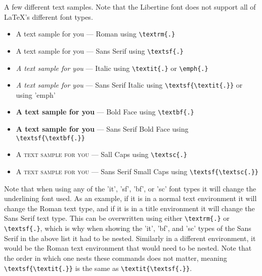 \documentclass[../thesis.tex]{subfiles}
\begin{document}
A few different text samples. Note that the Libertine font does not support all of \LaTeX's different font types.  
\begin{itemize}
    \item {\textrm{A text sample for you}} — Roman using \verb|\textrm{.}|
    \item {\textsf{A text sample for you}} — Sans Serif using \verb|\textsf{.}|
    \item {\textit{A text sample for you}} — Italic using \verb|\textit{.}| or \verb|\emph{.}|
    \item {\textsf{\textit{A text sample for you}}} — Sans Serif Italic using \verb|\textsf{\textit{.}}| or using 'emph'
    \item {\textbf{A text sample for you}} — Bold Face using \verb|\textbf{.}|
    \item {\textsf{\textbf{A text sample for you}}} — Sans Serif Bold Face using \verb|\textsf{\textbf{.}}|
    \item {\textsc{A text sample for you}} — Sall Caps using \verb|\textsc{.}|
    \item {\textsf{\textsc{A text sample for you}}} — Sans Serif Small Caps using \verb|\textsf{\textsc{.}}|
\end{itemize}

Note that when using any of the 'it', 'sf', 'bf', or 'sc' font types it will change the underlining font used. As an example, if it is in a normal text environment it will change the Roman text type, and if it is in a title environment it will change the Sans Serif text type. This can be overwritten using either \verb|\textrm{.}| or \verb|\textsf{.}|, which is why when showing the 'it', 'bf', and 'sc' types of the Sans Serif in the above list it had to be nested. Similarly in a different environment, it would be the Roman text environment that would need to be nested. Note that the order in which one nests these commands does not matter, meaning \verb|\textsf{\textit{.}}| is the same as \verb|\textit{\textsf{.}}|.
\end{document}
